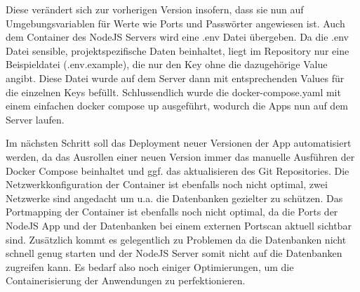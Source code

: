 Diese verändert sich zur vorherigen Version insofern, dass sie nun auf Umgebungsvariablen für Werte wie Ports und Passwörter angewiesen ist.
Auch dem Container des NodeJS Servers wird eine .env Datei übergeben.
Da die .env Datei sensible, projektspezifische Daten beinhaltet, liegt im Repository nur eine Beispieldatei (.env.example), die nur den Key ohne die dazugehörige Value angibt.
Diese Datei wurde auf dem Server dann mit entsprechenden Values für die einzelnen Keys befüllt.
Schlussendlich wurde die docker-compose.yaml mit einem einfachen docker compose up ausgeführt, wodurch die Apps nun auf dem Server laufen.

Im nächsten Schritt soll das Deployment neuer Versionen der App automatisiert werden, da das Ausrollen einer neuen Version immer das manuelle Ausführen der Docker Compose beinhaltet und ggf. das aktualisieren des Git Repositories.
Die Netzwerkkonfiguration der Container ist ebenfalls noch nicht optimal, zwei Netzwerke sind angedacht um u.a. die Datenbanken gezielter zu schützen.
Das Portmapping der Container ist ebenfalls noch nicht optimal, da die Ports der NodeJS App und der Datenbanken bei einem externen Portscan aktuell sichtbar sind.
Zusätzlich kommt es gelegentlich zu Problemen da die Datenbanken nicht schnell genug starten und der NodeJS Server somit nicht auf die Datenbanken zugreifen kann.
Es bedarf also noch einiger Optimierungen, um die Containerisierung der Anwendungen zu perfektionieren.